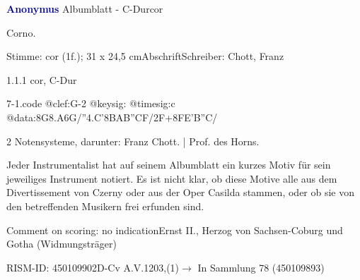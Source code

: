 \documentclass[a4paper, twocolumn, 11pt]{book}
\begin{document}
\par \vspace{16pt} \textcolor{darkblue}{\textbf{Anonymus  }}\hfillplus{[7]}\newline Albumblatt - C-Dur\newline cor
\par \begin{itshape}[heading:] Corno.\end{itshape} 
\par \textcolor{darkblue}{}  Stimme: cor  (1f.); 31 x 24,5 cm\newline Abschrift\newline Schreiber: Chott, Franz
\par 1.1.1  cor, C-Dur  
\begin{filecontents*}{7-1.code}
@clef:G-2
@keysig:
@timesig:c
@data:{8G8.A6G}/''4.C'8B{AB''CF}/2F+{8FE'B''C}/
\end{filecontents*}
\newline %
\par 2 Notensysteme, darunter: Franz Chott. | Prof. des Horns.
\par Jeder Instrumentalist hat auf seinem Albumblatt ein kurzes Motiv für sein jeweiliges Instrument notiert. Es ist nicht klar, ob diese Motive alle aus dem {\textquotedbl}Divertissement{\textquotedbl} von Czerny oder aus der Oper {\textquotedbl}Casilda{\textquotedbl} stammen, oder ob sie von den betreffenden Musikern frei erfunden sind.
\par Comment on scoring: no indication\newline Ernst II., Herzog von Sachsen-Coburg und Gotha  (Widmungsträger)
\par RISM-ID: 450109902\newline D-Cv  A.V.1203,(1)\newline $\rightarrow$ In Sammlung 78 (450109893)
      
\end{document}
